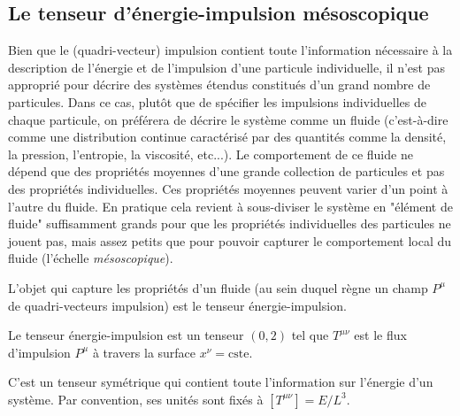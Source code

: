 \subsection{Le tenseur d'énergie-impulsion mésoscopique}
Bien que le (quadri-vecteur) impulsion contient toute l'information nécessaire à la description de l'énergie et de l'impulsion d'une particule individuelle, il n'est pas approprié pour décrire des systèmes étendus constitués d'un grand nombre de particules. Dans ce cas, plutôt que de spécifier les impulsions individuelles de chaque particule, on préférera de décrire le système comme un fluide (c'est-à-dire comme une distribution continue caractérisé par des quantités comme la densité, la pression, l'entropie, la viscosité, etc...). Le comportement de ce fluide ne dépend que des propriétés moyennes d'une grande collection de particules et pas des propriétés individuelles. Ces propriétés moyennes peuvent varier d'un point à l'autre du fluide. En pratique cela revient à sous-diviser le système en "élément de fluide" suffisamment grands pour que les propriétés individuelles des particules ne jouent pas, mais assez petits que pour pouvoir capturer le comportement local du fluide (l'échelle \emph{mésoscopique}). 

L'objet qui capture les propriétés d'un fluide (au sein duquel règne un champ $P^{\mu}$ de quadri-vecteurs impulsion) est le tenseur énergie-impulsion.
\begin{theoremframe}
    \begin{defi}
        Le tenseur énergie-impulsion est un tenseur $(0,2)$ tel que $T^{\mu \nu} $ est le flux d'impulsion $P^{\mu}$ à travers la surface $x^{\nu} = \text{cste}$.
    \end{defi}
\end{theoremframe}
C'est un tenseur symétrique qui contient toute l'information sur l'énergie d'un système. Par convention, ses unités sont fixés à $[T^{\mu\nu}] = E/L^3$.
